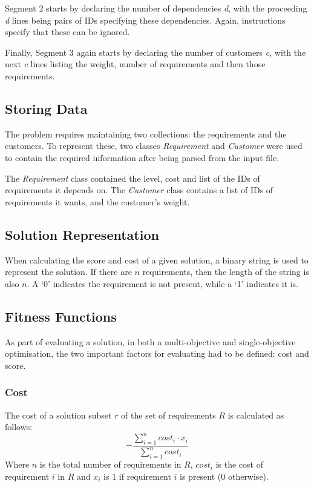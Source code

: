 \documentclass[11pt, a4paper]{article}
\begin{document}
Segment 2 starts by declaring the number of dependencies \emph{d}, with the
proceeding \emph{d} lines being pairs of IDs specifying these dependencies.
Again, instructions specify that these can be ignored.

Finally, Segment 3 again starts by declaring the number of customers \emph{c},
with the next \emph{c} lines listing the weight, number of requirements and then
those requirements.

\subsection{Storing Data} %
\label{sub:storing_data}
The problem requires maintaining two collections: the requirements and the
customers. To represent these, two classes \emph{Requirement} and
\emph{Customer} were used to contain the required information after being parsed
from the input file.

The \emph{Requirement} class contained the level, cost and list of the IDs of
requirements it depends on. The \emph{Customer} class contains a list of IDs of
requirements it wants, and the customer's weight.

\subsection{Solution Representation} %
\label{sub:Solution_representation}
When calculating the score and cost of a given solution, a binary string is used
to represent the solution. If there are \(n\) requirements, then the length of
the string is also \(n\). A `0' indicates the requirement is not present, while
a `1' indicates it is.

\subsection{Fitness Functions} %
\label{sub:fitness_functions}
As part of evaluating a solution, in both a multi-objective and single-objective
optimisation, the two important factors for evaluating had to be defined: cost
and score.

\subsubsection{Cost} %
\label{ssub:cost}
The cost of a solution subset \(r\) of the set of requirements \(R\) is
calculated as follows:
\[- \frac{\sum_{i=1}^{n} cost_i \cdot x_i}{\sum_{i=1}^{n} cost_i} \]
Where \(n\) is the total number of requirements in \(R\), \(cost_i\) is the cost
of requirement \(i\) in \(R\) and \(x_i\) is 1 if requirement \(i\) is present
(0 otherwise).
\end{document}
